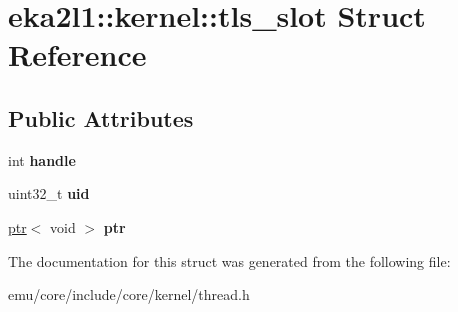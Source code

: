 \hypertarget{structeka2l1_1_1kernel_1_1tls__slot}{}\section{eka2l1\+:\+:kernel\+:\+:tls\+\_\+slot Struct Reference}
\label{structeka2l1_1_1kernel_1_1tls__slot}
\subsection*{Public Attributes}
\begin{DoxyCompactItemize}
\item 
\mbox{\label{structeka2l1_1_1kernel_1_1tls__slot_afe4798712b240788ab4d6a0b64d9222a}} 
int {\bfseries handle}
\item 
\mbox{\label{structeka2l1_1_1kernel_1_1tls__slot_a8177256a6f42281dab7e10097c01bc5f}} 
uint32\+\_\+t {\bfseries uid}
\item 
\mbox{\label{structeka2l1_1_1kernel_1_1tls__slot_a3d9ed1ef2823620f557c005c2aff6597}} 
\mbox{\hyperlink{classeka2l1_1_1ptr}{ptr}}$<$ void $>$ {\bfseries ptr}
\end{DoxyCompactItemize}


The documentation for this struct was generated from the following file\+:\begin{DoxyCompactItemize}
\item 
emu/core/include/core/kernel/thread.\+h\end{DoxyCompactItemize}
